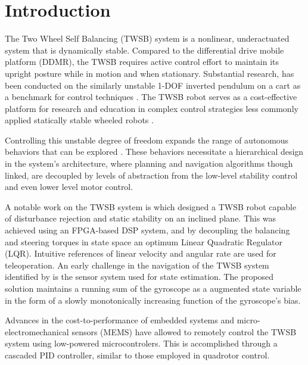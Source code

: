   \uomdeclarations

    \section{Introduction}
    The Two Wheel Self Balancing (TWSB) system is a nonlinear, underactuated system that is dynamically stable.
    Compared to the differential drive mobile platform (DDMR), the TWSB requires active control effort
    to maintain its upright posture while in motion and when stationary.
    Substantial research, has been conducted on the similarly unstable 1-DOF inverted pendulum on a cart 
    as a benchmark for control techniques \cite{boubaker2013inverted}. 
    The TWSB robot serves as a cost-effective platform for research and education in complex control 
    strategies less commonly applied statically stable wheeled robots \cite{educationPlatform}.
    
    Controlling this unstable degree of freedom expands the range of autonomous behaviors that 
    can be explored \cite{RoboLimbo} \cite{jeong2008wheeled} \cite{Browning2004TurningSI}. 
    These behaviors necessitate a hierarchical design in the system's architecture,
    where planning and navigation algorithms though linked, are decoupled by levels of abstraction 
    from the low-level stability control and even lower level motor control.
    
    A notable work on the TWSB system is \cite{grasser2002joe} which designed a TWSB robot capable of disturbance
    rejection and static stability on an inclined plane. This was achieved using an FPGA-based DSP system, 
    and by decoupling the balancing and steering torques in state space an optimum Linear Quadratic Regulator (LQR). 
    Intuitive references of linear velocity and angular rate are used for teleoperation. An early challenge in the navigation of the TWSB system 
    identified by \cite{SelfContainedMobileTWSB} is the sensor system used for state estimation. The proposed solution 
    maintains a running sum of the gyroscope as a augmented state variable in the form of a slowly monotonically increasing function of the gyroscope's bias.

    Advances in the cost-to-performance of embedded systems and micro-electromechanical sensors (MEMS) \cite{MEMS} 
    have allowed \cite{juang2013design} \cite{Velazquez2016VelocityAM} to remotely control the TWSB system 
    using low-powered microcontrolers. This is accomplished through a cascaded PID controller, 
    similar to those employed in quadrotor control.
    
